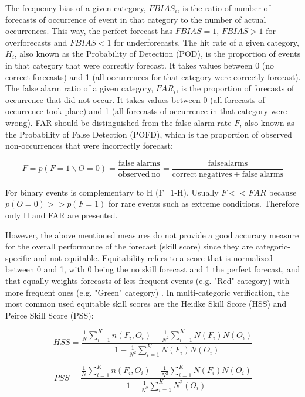 The frequency bias of a given category, $FBIAS_i$, is the ratio of number of forecasts of occurrence of event in that category to the number of actual occurrences. This way, the perfect forecast has $FBIAS=1$, $FBIAS>1$ for overforecasts and $FBIAS < 1$ for underforecasts. The hit rate of a given category, $H_i$, also known as the Probability of Detection (POD), is the proportion of events in that category that were correctly forecast. It takes values between 0 (no correct forecasts) and 1 (all occurrences for that category were correctly forecast). The false alarm ratio of a given category, $FAR_i$, is the proportion of forecasts of occurrence that did not occur. It takes values between 0 (all forecasts of occurrence took place) and 1 (all forecasts of occurrence in that category were wrong). FAR should be distinguished from the false alarm rate $F$, also known as the Probability of False Detection (POFD), which is the proportion of observed non-occurrences that were incorrectly forecast:

\begin{equation}
F = p(F=1 \backslash O=0 ) = \frac{\mathrm{false\ alarms}}{\mathrm{observed\ no}} = \frac{\mathrm{false alarms}}{\mathrm{correct\ negatives + false\ alarms }} 
\end{equation}

For binary events is complementary to H (F=1-H). Usually $F << FAR$ because $p(O=0) >> p(F=1)$ for rare events such as extreme conditions. Therefore only H and FAR are presented.


However, the above mentioned measures do not provide a good accuracy measure for the overall performance of the forecast (skill score) since they are categoric-specific and not equitable. Equitability refers to a score that is normalized between 0 and 1, with 0 being the no skill forecast and 1 the perfect forecast, and that equally weights forecasts of less frequent events (e.g. "Red" category) with more frequent ones (e.g. "Green" category) \citep{Wilks2005}. In multi-categoric verification, the most common used equitable skill scores are the Heidke Skill Score (HSS) and Peirce Skill Score (PSS):

\begin{equation}
HSS = \frac{\frac{1}{N} \sum\limits^K_{i=1}n(F_i,O_i) - \frac{1}{N^2} \sum\limits^K_{i=1} N(F_i)N(O_i)}{1- \frac{1}{N^2} \sum\limits^K_{i=1} N(F_i)N(O_i)}
\end{equation}


\begin{equation}
PSS = \frac{\frac{1}{N} \sum\limits^K_{i=1}n(F_i,O_i) - \frac{1}{N^2} \sum\limits^K_{i=1} N(F_i)N(O_i)}{1- \frac{1}{N^2} \sum\limits^K_{i=1} N^2(O_i)}
\end{equation}


